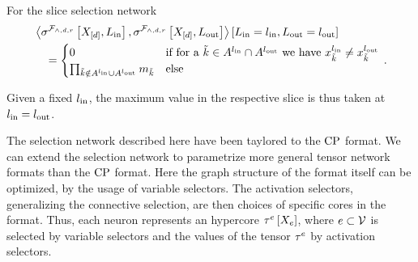 \begin{example}

	For the slice selection network
	\begin{align*}
		& \left\langle \sigma^{\mathcal{F}_{\land,d,r}}\left[X_{[d]},L_{\mathrm{in}}\right],\sigma^{\mathcal{F}_{\land,d,r}}\left[X_{[d]},L_{\mathrm{out}}\right]\right\rangle \left[ L_{\mathrm{in}}=l_{\mathrm{in}},L_{\mathrm{out}}=l_{\mathrm{out}} \right] \\
		& \quad = \begin{cases}
			0 & \text{if for a }\tilde{k}\in A^{l_{\mathrm{in}}}\cap A^{l_{\mathrm{out}}}\text{ we have }x_{\tilde{k}}^{l_{\mathrm{in}}}\neq x_{\tilde{k}}^{l_{\mathrm{out}}} \\
			\prod_{\tilde{k}\notin A^{l_{\mathrm{in}}}\cup A^{l_{\mathrm{out}}}} m_{\tilde{k}}& \text{else} 
		\end{cases} \, . 
	\end{align*}

	Given a fixed $l_{\mathrm{in}}$, the maximum value in the respective slice is thus taken at $l_{\mathrm{in}}=l_{\mathrm{out}}$.
\end{example}



The selection network described here have been taylored to the $\mathrm{CP}$ format.
We can extend the selection network to parametrize more general tensor network formats than the $\mathrm{CP}$ format.
Here the graph structure of the format itself can be optimized, by the usage of variable selectors.
The activation selectors, generalizing the connective selection, are then choices of specific cores in the format.
Thus, each neuron represents an hypercore $\tau^{e}\left[X_{e}\right]$, where $e\subset\mathcal{V}$ is selected by variable selectors and the values of the tensor $\tau^{e}$ by activation selectors.

